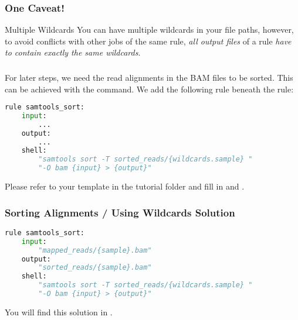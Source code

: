 \begin{frame}
	\frametitle{One Caveat!}
	\begin{alertblock}{Multiple Wildcards}
		You can have multiple wildcards in your file paths, however, to avoid conflicts with other jobs of the same rule, \emph{all output files} of a rule \emph{have to contain exactly the same wildcards}.
	\end{alertblock}
\end{frame}

\begin{frame}[fragile]
  \frametitle{}
  For later steps, we need the read alignments in the BAM files to be sorted. This can be achieved with the   command. We add the following rule beneath the  rule:
  \begin{lstlisting}[language=Python,style=Python]
rule samtools_sort:
    input:
        ...
    output:
        ...
    shell:
        "samtools sort -T sorted_reads/{wildcards.sample} "
        "-O bam {input} > {output}"
  \end{lstlisting}
  \begin{task}
  	Please refer to your template \newline {} in the tutorial folder and fill in  and .
  \end{task}
\end{frame}

\begin{frame}[fragile]
  \frametitle{Sorting Alignments / Using Wildcards Solution}
  \begin{lstlisting}[language=Python,style=Python]
rule samtools_sort:
    input:
        "mapped_reads/{sample}.bam"
    output:
        "sorted_reads/{sample}.bam"
    shell:
        "samtools sort -T sorted_reads/{wildcards.sample} "
        "-O bam {input} > {output}"
  \end{lstlisting}
  You will find this solution in .
\end{frame}

